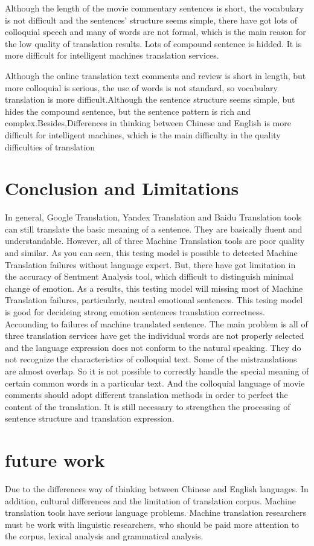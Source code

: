 \documentclass[conference]{IEEEtran}
\begin{document}
\begin{CJK*}{UTF8}{gbsn}
 Although the length of the movie commentary sentences is short, the vocabulary
is not difficult and the sentences' structure seems simple, there have got
lots of colloquial speech and many of words are not formal, which is the main
reason for the low quality of translation results. Lots of compound
sentence is hidded. It is more difficult for intelligent machines translation
services.

Although the online translation text comments and review is short in length, but
more colloquial is serious, the use of words is not standard, so vocabulary
translation is more difficult.Although the sentence structure seems simple, but
hides the compound sentence, but the sentence pattern is rich and
complex.Besides,Differences in thinking between Chinese and English is more
difficult for intelligent machines, which is the main difficulty in the quality
difficulties of translation

 \section{Conclusion and Limitations}
In general, Google Translation, Yandex Translation and Baidu Translation tools
can still translate the basic meaning of a sentence. They are basically fluent
and understandable. However, all of three Machine Translation tools are poor
quality and similar. As you can seen, this tesing model is possible to detected Machine
Translation failures without language expert. But, there have got limitation in
the accuracy of Sentment Analysis tool, which difficult to distinguish minimal
change of emotion. As a results, this testing model will missing most of Machine
Translation failures, particularly, neutral emotional sentences. This tesing
model is good for decideing strong emotion sentences translation correctness.
Accounding to failures of machine translated sentence. The main problem is all
of three translation services have get the individual words are not properly
selected and the language expression does not conform to the natural speaking.
They do not recognize the characteristics of colloquial text. Some of the
mistranslations are almost overlap. So it is not possible to correctly handle
the special meaning of certain common words in a particular text. And the
colloquial language of movie comments should adopt different translation methods
in order to perfect the content of the translation. It is still necessary to
strengthen the processing of sentence structure and translation expression.

\section{future work}
Due to the differences way of thinking between Chinese and English languages. In
addition, cultural differences and the limitation of translation corpus. Machine
translation tools have serious language problems. Machine translation
researchers must be work with linguistic researchers, who should be paid more
attention to the corpus, lexical analysis and grammatical analysis.



\end{CJK*}
\end{document}
